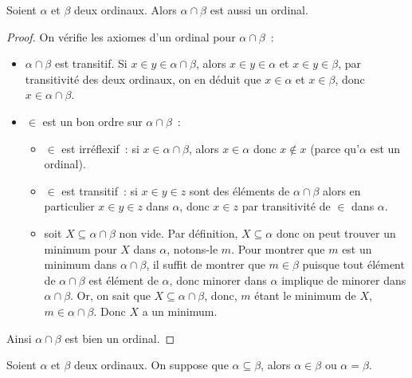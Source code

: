 \begin{proposition}
  Soient $\alpha$ et $\beta$ deux ordinaux. Alors $\alpha\cap \beta$ est aussi
  un ordinal.
\end{proposition}

\begin{proof}
  On vérifie les axiomes d'un ordinal pour $\alpha\cap\beta$~:
  \begin{itemize}
  \item $\alpha \cap \beta$ est transitif. Si $x\in y \in \alpha \cap \beta$,
    alors $x\in y\in \alpha$ et $x\in y \in\beta$, par transitivité des deux
    ordinaux, on en déduit que $x\in \alpha$ et $x\in \beta$, donc
    $x\in\alpha\cap\beta$.
  \item $\in$ est un bon ordre sur $\alpha\cap\beta$~:
    \begin{itemize}
    \item $\in$ est irréflexif~: si $x \in \alpha\cap\beta$, alors $x\in \alpha$
      donc $x\notin x$ (parce qu'$\alpha$ est un ordinal).
    \item $\in$ est transitif~: si $x\in y\in z$ sont des éléments de
      $\alpha\cap\beta$ alors en particulier $x\in y \in z$ dans $\alpha$, donc
      $x\in z$ par transitivité de $\in$ dans $\alpha$.
    \item soit $X\subseteq \alpha\cap \beta$ non vide. Par définition,
      $X\subseteq \alpha$ donc on peut trouver un minimum pour $X$ dans
      $\alpha$, notons-le $m$. Pour montrer que $m$ est un minimum dans
      $\alpha\cap \beta$, il suffit de montrer que $m \in \beta$ puisque tout
      élément de $\alpha\cap \beta$ est élément de $\alpha$, donc minorer dans
      $\alpha$ implique de minorer dans $\alpha\cap\beta$. Or, on sait que
      $X\subseteq \alpha\cap \beta$, donc, $m$ étant le minimum de $X$,
      $m\in \alpha\cap\beta$. Donc $X$ a un minimum.
    \end{itemize}
  \end{itemize}
  Ainsi $\alpha\cap\beta$ est bien un ordinal.
\end{proof}

\begin{proposition}
  Soient $\alpha$ et $\beta$ deux ordinaux. On suppose que
  $\alpha \subseteq \beta$, alors $\alpha \in \beta$ ou $\alpha = \beta$.
\end{proposition}

